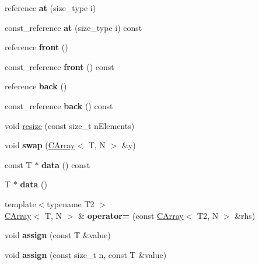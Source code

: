 \begin{DoxyCompactItemize}
reference {\bfseries at} (size\+\_\+type i)
\item 
\hypertarget{classSph_1_1CArray_a9cb82eaa97aa23cbe864e6153aaae68d}{}\label{classSph_1_1CArray_a9cb82eaa97aa23cbe864e6153aaae68d} 
const\+\_\+reference {\bfseries at} (size\+\_\+type i) const
\item 
\hypertarget{classSph_1_1CArray_ae9f12154cbce9a16bb5769c2b49c14b1}{}\label{classSph_1_1CArray_ae9f12154cbce9a16bb5769c2b49c14b1} 
reference {\bfseries front} ()
\item 
\hypertarget{classSph_1_1CArray_aa4996fb41c9b9120bb37eb24fdce5f90}{}\label{classSph_1_1CArray_aa4996fb41c9b9120bb37eb24fdce5f90} 
const\+\_\+reference {\bfseries front} () const
\item 
\hypertarget{classSph_1_1CArray_a21617d918c04249f986c4c9ff97a4131}{}\label{classSph_1_1CArray_a21617d918c04249f986c4c9ff97a4131} 
reference {\bfseries back} ()
\item 
\hypertarget{classSph_1_1CArray_a66adc6a8d0688e453503eb2038a78a1c}{}\label{classSph_1_1CArray_a66adc6a8d0688e453503eb2038a78a1c} 
const\+\_\+reference {\bfseries back} () const
\item 
void \hyperlink{classSph_1_1CArray_a0f5c967e81e4aa9bd97acab77f88df72}{resize} (const size\+\_\+t n\+Elements)
\item 
\hypertarget{classSph_1_1CArray_a0fce6bec8be2d9008db0a52dd13d10c2}{}\label{classSph_1_1CArray_a0fce6bec8be2d9008db0a52dd13d10c2} 
void {\bfseries swap} (\hyperlink{classSph_1_1CArray}{C\+Array}$<$ T, N $>$ \&y)
\item 
\hypertarget{classSph_1_1CArray_a3f47638e837f79b133f747f7da7d56e2}{}\label{classSph_1_1CArray_a3f47638e837f79b133f747f7da7d56e2} 
const T $\ast$ {\bfseries data} () const
\item 
\hypertarget{classSph_1_1CArray_a306eb2484aea0023d3057d098a23647e}{}\label{classSph_1_1CArray_a306eb2484aea0023d3057d098a23647e} 
T $\ast$ {\bfseries data} ()
\item 
\hypertarget{classSph_1_1CArray_a9f56750ad506bf8c9c229799a3b7692b}{}\label{classSph_1_1CArray_a9f56750ad506bf8c9c229799a3b7692b} 
{\footnotesize template$<$typename T2 $>$ }\\\hyperlink{classSph_1_1CArray}{C\+Array}$<$ T, N $>$ \& {\bfseries operator=} (const \hyperlink{classSph_1_1CArray}{C\+Array}$<$ T2, N $>$ \&rhs)
\item 
\hypertarget{classSph_1_1CArray_a55970c9413e23ded6c5900a76390bb08}{}\label{classSph_1_1CArray_a55970c9413e23ded6c5900a76390bb08} 
void {\bfseries assign} (const T \&value)
\item 
\hypertarget{classSph_1_1CArray_afeb8b345e6bda66e143d40b9c806643a}{}\label{classSph_1_1CArray_afeb8b345e6bda66e143d40b9c806643a} 
void {\bfseries assign} (const size\+\_\+t n, const T \&value)
\end{DoxyCompactItemize}
